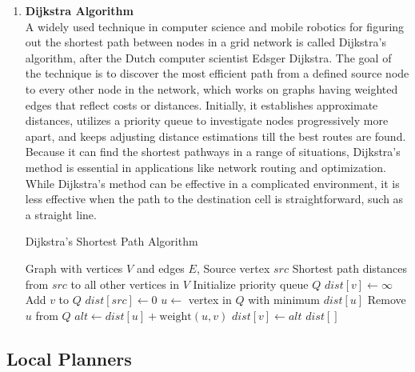 \documentclass[sigconf]{acmart}
\begin{document}
\begin{enumerate}
\item \textbf{Dijkstra Algorithm}\\
A widely used technique in computer science and mobile robotics for figuring out the shortest path between nodes in a grid network is called Dijkstra's algorithm, after the Dutch computer scientist Edsger Dijkstra. The goal of the technique is to discover the most efficient path from a defined source node to every other node in the network, which works on graphs having weighted edges that reflect costs or distances. Initially, it establishes approximate distances, utilizes a priority queue to investigate nodes progressively more apart, and keeps adjusting distance estimations till the best routes are found. Because it can find the shortest pathways in a range of situations, Dijkstra's method is essential in applications like network routing and optimization. While Dijkstra's method can be effective in a complicated environment, it is less effective when the path to the destination cell is straightforward, such as a straight line.\cite{b1}

\begin{algorithm}
\caption{Dijkstra's Shortest Path Algorithm}
\begin{algorithmic}[1] %
\REQUIRE Graph with vertices $V$ and edges $E$, Source vertex $src$
\ENSURE Shortest path distances from $src$ to all other vertices in $V$
\STATE Initialize priority queue $Q$
    \STATE $dist[v] \leftarrow \infty$
    \STATE Add $v$ to $Q$
\ENDFOR
\STATE $dist[src] \leftarrow 0$
    \STATE $u \leftarrow$ vertex in $Q$ with minimum $dist[u]$
    \STATE Remove $u$ from $Q$
        \STATE $alt \leftarrow dist[u] + \text{weight}(u, v)$
            \STATE $dist[v] \leftarrow alt$
        \ENDIF
    \ENDFOR
\ENDWHILE
\STATE \RETURN $dist[]$
\end{algorithmic}
\end{algorithm}


\end{enumerate}




\subsection{Local Planners}
\end{document}
